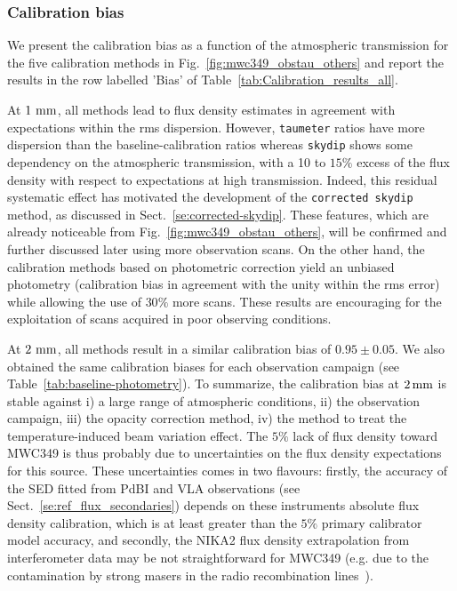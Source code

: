 \subsubsection{Calibration bias}
\label{se:calibration_bias_all}

We present the calibration bias as a function of the atmospheric
transmission for the five calibration methods in
Fig.~\ref{fig:mwc349_obstau_others} and report the results in the row
labelled 'Bias' of Table~\ref{tab:Calibration_results_all}.

At $1~\rm{mm}$, all methods lead to flux density estimates in
agreement with expectations within the rms dispersion. However,
{\tt taumeter} ratios have more dispersion than the baseline-calibration
ratios whereas {\tt skydip} shows some dependency on the atmospheric
transmission, with a 10 to $15\%$ excess of the flux density with
respect to expectations at high transmission. Indeed, this residual
systematic effect has motivated the development of the {\tt corrected
  skydip} method, as discussed in
Sect.~\ref{se:corrected-skydip}. These features, which are
already noticeable from Fig.~\ref{fig:mwc349_obstau_others}, will be
confirmed and further discussed later using more observation scans. On
the other hand, the calibration methods based on photometric correction yield an
unbiased photometry (calibration bias in agreement with the unity
within the rms error) while allowing the use of $30\%$ more scans. These results are
encouraging for the exploitation of scans acquired in poor
observing conditions.

At $2~\rm{mm}$, all methods result in a similar calibration bias
of $0.95 \pm 0.05$. We also obtained the same calibration
biases for each observation campaign (see
Table~\ref{tab:baseline-photometry}). To summarize, the
calibration bias at $2\, \rm{mm}$ is stable against i) a large range of
atmospheric conditions, ii) the observation campaign, iii) the
opacity correction method, iv) the method to treat the
temperature-induced beam variation effect.
The $5\%$ lack of flux density toward MWC349 is thus probably due to
uncertainties on the flux density expectations for this source.
These uncertainties comes in two flavours:
firstly, the accuracy of the SED fitted from PdBI and VLA observations
(see Sect.~\ref{se:ref_flux_secondaries})
depends on these instruments absolute flux density calibration, which
is at least greater than the $5\%$ primary calibrator model accuracy, 
and secondly, the NIKA2 flux density extrapolation from
interferometer data may be not straightforward for MWC349 (e.g. due to
the contamination by strong masers in the radio recombination
lines~\citep{masingRRL}).

